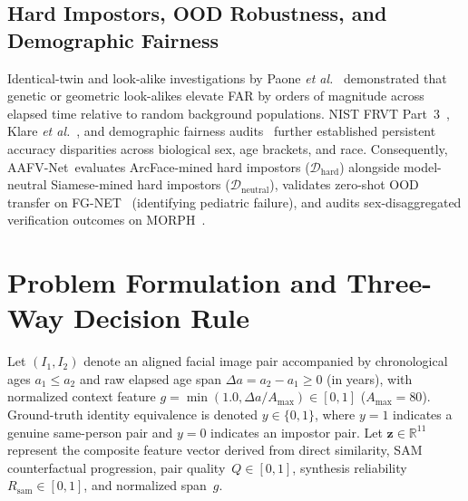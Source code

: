 \documentclass[journal]{IEEEtran}
\newcommand{\sys}{AAFV-Net}
\newcommand{\vect}[1]{\mathbf{#1}}
\begin{document}
\subsection{Hard Impostors, OOD Robustness, and Demographic Fairness}
Identical-twin and look-alike investigations by Paone \emph{et al.}~\cite{paone2014twins} demonstrated that genetic or geometric look-alikes elevate FAR by orders of magnitude across elapsed time relative to random background populations. NIST FRVT Part~3~\cite{grother2019frvt_part3}, Klare \emph{et al.}~\cite{klare2012demographics}, and demographic fairness audits~\cite{buolamwini2018gendershades} further established persistent accuracy disparities across biological sex, age brackets, and race. Consequently, \sys\ evaluates ArcFace-mined hard impostors ($\mathcal{D}_{\text{hard}}$) alongside model-neutral Siamese-mined hard impostors ($\mathcal{D}_{\text{neutral}}$), validates zero-shot OOD transfer on FG-NET~\cite{lanitis2002fgnet} (identifying pediatric failure), and audits sex-disaggregated verification outcomes on MORPH~\cite{ricanek2006morph}.

\section{Problem Formulation and Three-Way Decision Rule}
\label{sec:formulation}
Let $(I_1, I_2)$ denote an aligned facial image pair accompanied by chronological ages $a_1 \le a_2$ and raw elapsed age span $\Delta a = a_2 - a_1 \ge 0$ (in years), with normalized context feature $g = \min(1.0, \Delta a / A_{\max}) \in [0, 1]$ ($A_{\max} = 80$). Ground-truth identity equivalence is denoted $y \in \{0, 1\}$, where $y=1$ indicates a genuine same-person pair and $y=0$ indicates an impostor pair. Let $\vect{z} \in \mathbb{R}^{11}$ represent the composite feature vector derived from direct similarity, SAM counterfactual progression, pair quality~$Q \in [0, 1]$, synthesis reliability~$R_{\text{sam}} \in [0, 1]$, and normalized span~$g$.
\end{document}
